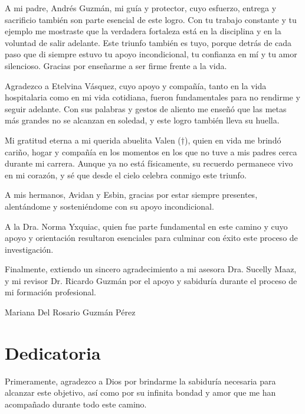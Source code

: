 \documentclass[11pt,letterpaper]{report}
\begin{document}
A mi padre, Andrés Guzmán, mi guía y protector, cuyo esfuerzo, entrega y 
sacrificio también son parte esencial de este logro. Con tu trabajo constante 
y tu ejemplo me mostraste que la verdadera fortaleza está en la disciplina y 
en la voluntad de salir adelante. Este triunfo también es tuyo, porque detrás 
de cada paso que di siempre estuvo tu apoyo incondicional, tu confianza en mí 
y tu amor silencioso. Gracias por enseñarme a ser firme frente a la vida.

Agradezco a Etelvina Vásquez, cuyo apoyo y compañía, tanto en la vida 
hospitalaria como en mi vida cotidiana, fueron fundamentales para no rendirme 
y seguir adelante. Con sus palabras y gestos de aliento me enseñó que las 
metas más grandes no se alcanzan en soledad, y este logro también lleva su 
huella.

Mi gratitud eterna a mi querida abuelita Valen ($\dagger$), quien en vida me
brindó cariño, hogar y compañía en los momentos en los que no tuve a mis padres
cerca durante mi carrera. Aunque ya no está físicamente, su recuerdo permanece
vivo en mi corazón, y sé que desde el cielo celebra conmigo este triunfo.

A mis hermanos, Avidan y Esbin, gracias por estar siempre presentes, 
alentándome y sosteniéndome con su apoyo incondicional.

A la Dra. Norma Yxquiac, quien fue parte fundamental en este camino y cuyo 
apoyo y orientación resultaron esenciales para culminar con éxito este proceso 
de investigación.

Finalmente, extiendo un sincero agradecimiento a mi asesora Dra. Sucelly Maaz, y
mi revisor Dr. Ricardo Guzmán por el apoyo y sabiduría durante el proceso de
mi formación profesional.



\begin{flushright}
Mariana Del Rosario Guzmán Pérez
\end{flushright}

\chapter*{Dedicatoria}
Primeramente, agradezco a Dios por brindarme la sabiduría necesaria para
alcanzar este objetivo, así como por su infinita bondad y amor que me han
acompañado durante todo este camino.
\end{document}
